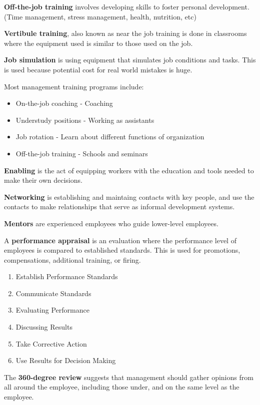 \documentclass[english, 12pt]{article}
\begin{document}
\begin{defn}
\textbf{Off-the-job training} involves developing skills to foster personal development. (Time management, stress management, health, nutrition, etc)
\end{defn}
\begin{defn}
\textbf{Vertibule training}, also known as near the job training is done in classrooms where the equipment used is similar to those used on the job.
\end{defn}
\begin{defn}
\textbf{Job simulation} is using equipment that simulates job conditions and tasks. This is used because potential cost for real world mistakes is huge.
\end{defn}
Most management training programs include:
\begin{itemize}
\item On-the-job coaching - Coaching
\item Understudy positions - Working as assistants
\item Job rotation - Learn about different functions of organization
\item Off-the-job training - Schools and seminars
\end{itemize}
\begin{defn}
\textbf{Enabling} is the act of equipping workers with the education and tools needed to make their own decisions.
\end{defn}
\begin{defn}
\textbf{Networking} is establishing and maintaing contacts with key people, and use the contacts to make relationships that serve as informal development systems.
\end{defn}
\begin{defn}
\textbf{Mentors} are experienced employees who guide lower-level employees.
\end{defn}
\begin{defn}
A \textbf{performance appraisal} is an evaluation where the performance level of employees is compared to established standards. This is used for promotions, compensations, additional training, or firing.
\begin{enumerate}
\item Establish Performance Standards
\item Communicate Standards
\item Evaluating Performance
\item Discussing Results
\item Take Corrective Action
\item Use Results for Decision Making
\end{enumerate}
\end{defn}
\begin{defn}
The \textbf{360-degree review} suggests that management should gather opinions from all around the employee, including those under, and on the same level as the employee.
\end{defn}
\end{document}
